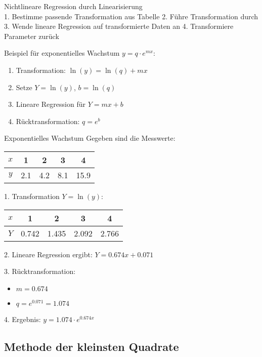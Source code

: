 \begin{KR}{Nichtlineare Regression durch Linearisierung}\\
1. Bestimme passende Transformation aus Tabelle
2. Führe Transformation durch
3. Wende lineare Regression auf transformierte Daten an
4. Transformiere Parameter zurück

Beispiel für exponentielles Wachstum $y=q \cdot e^{mx}$:
\begin{enumerate}
  \item Transformation: $\ln(y)=\ln(q)+mx$
  \item Setze $Y=\ln(y)$, $b=\ln(q)$
  \item Lineare Regression für $Y=mx+b$
  \item Rücktransformation: $q=e^b$
\end{enumerate}
\end{KR}

\begin{example2}{Exponentielles Wachstum}
Gegeben sind die Messwerte:
\begin{center}
\begin{tabular}{|c|c|c|c|c|}
\hline
$x$ & 1 & 2 & 3 & 4 \\
\hline
$y$ & 2.1 & 4.2 & 8.1 & 15.9 \\
\hline
\end{tabular}
\end{center}

1. Transformation $Y=\ln(y)$:
\begin{center}
\begin{tabular}{|c|c|c|c|c|}
\hline
$x$ & 1 & 2 & 3 & 4 \\
\hline
$Y$ & 0.742 & 1.435 & 2.092 & 2.766 \\
\hline
\end{tabular}
\end{center}

2. Lineare Regression ergibt: $Y = 0.674x + 0.071$

3. Rücktransformation:
   \begin{itemize}
     \item $m = 0.674$
     \item $q = e^{0.071} = 1.074$
   \end{itemize}

4. Ergebnis: $y = 1.074 \cdot e^{0.674x}$
\end{example2}

\subsection{Methode der kleinsten Quadrate}

